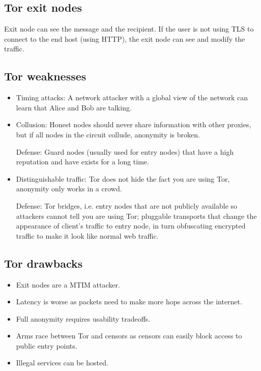 \subsection{Tor exit nodes}
Exit node can see the message and the recipient. If the user is not using TLS to connect to the end host (using HTTP), the exit node can see and modify the traffic.

\subsection{Tor weaknesses}
\begin{itemize}
    \item Timing attacks: A network attacker with a global view of the network can learn that Alice and Bob are talking.
    \item Collusion: Honest nodes should never share information with other proxies, but if all nodes in the circuit collude, anonymity is broken.

    Defense: Guard nodes (usually used for entry nodes) that have a high reputation and have exists for a long time.

    \item Distinguishable traffic: Tor does not hide the fact you are using Tor, anonymity only works in a crowd.

    Defense: Tor bridges, i.e. entry nodes that are not publicly available so attackers cannot tell you are using Tor; pluggable transports that change the appearance of client's traffic to entry node, in turn obfuscating encrypted traffic to make it look  like normal web traffic.
\end{itemize}

\subsection{Tor drawbacks}
\begin{itemize}
    \item Exit nodes are a MTIM attacker.
    \item Latency is worse as packets need to make more hops across the internet.
    \item Full anonymity requires usability tradeoffs.
    \item Arms race between Tor and censors as censors can easily block access to public entry points.
    \item Illegal services can be hosted.
\end{itemize}